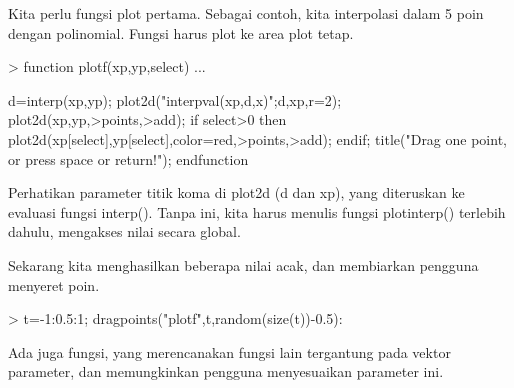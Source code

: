 \documentclass{report}
\begin{document}
\begin{eulernotebook}
\begin{eulercomment}
\begin{eulercomment}
\begin{eulercomment}
\begin{eulercomment}
\begin{eulercomment}
Kita perlu fungsi plot pertama. Sebagai contoh, kita interpolasi dalam
5 poin dengan polinomial. Fungsi harus plot ke area plot tetap.
\end{eulercomment}
\begin{eulerprompt}
> function plotf(xp,yp,select) ...
\end{eulerprompt}
\begin{eulerudf}
    d=interp(xp,yp);
    plot2d("interpval(xp,d,x)";d,xp,r=2);
    plot2d(xp,yp,>points,>add);
    if select>0 then
      plot2d(xp[select],yp[select],color=red,>points,>add);
    endif;
    title("Drag one point, or press space or return!");
  endfunction
\end{eulerudf}
\begin{eulercomment}
Perhatikan parameter titik koma di plot2d (d dan xp), yang diteruskan
ke evaluasi fungsi interp(). Tanpa ini, kita harus menulis fungsi
plotinterp() terlebih dahulu, mengakses nilai secara global.

Sekarang kita menghasilkan beberapa nilai acak, dan membiarkan
pengguna menyeret poin.
\end{eulercomment}
\begin{eulerprompt}
> t=-1:0.5:1; dragpoints("plotf",t,random(size(t))-0.5):
\end{eulerprompt}
\begin{eulercomment}
Ada juga fungsi, yang merencanakan fungsi lain tergantung pada vektor
parameter, dan memungkinkan pengguna menyesuaikan parameter ini.


\end{eulercomment}
\end{eulercomment}
\end{eulercomment}
\end{eulercomment}
\end{eulercomment}
\end{eulernotebook}
\end{document}
